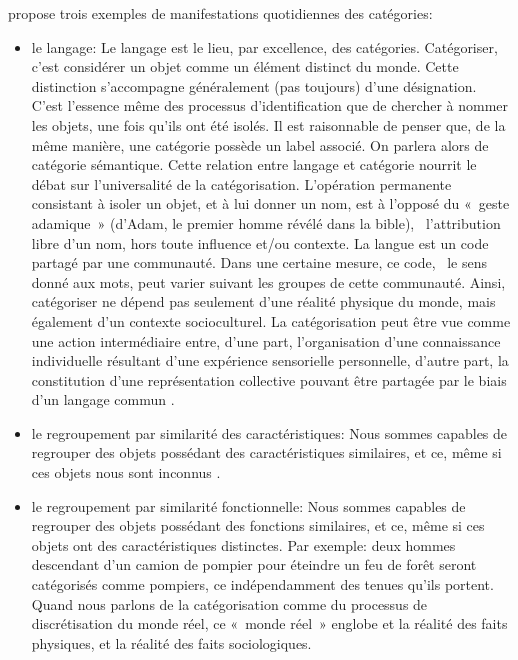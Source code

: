 \citep{anderson1991adaptive} propose trois exemples de manifestations quotidiennes des catégories:

\begin{itemize}

\item le langage: Le langage est le lieu, par excellence, des catégories. Catégoriser, c'est considérer un objet comme un élément distinct du monde. Cette distinction s'accompagne généralement (pas toujours) d'une désignation. C'est l'essence même des processus d'identification que de chercher à nommer les objets, une fois qu'ils ont été isolés. Il est raisonnable de penser que, de la même manière, une catégorie possède un label associé. On parlera alors de catégorie sémantique. Cette relation entre langage et catégorie nourrit le débat sur l'universalité de la catégorisation. L'opération permanente consistant à isoler un objet, et à lui donner un nom, est à l'opposé du «~geste adamique~» (d'Adam, le premier homme révélé dans la bible), \ie~l'attribution libre d'un nom, hors toute influence et/ou contexte. La langue est un code partagé par une communauté. Dans une certaine mesure, ce code, \ie~le sens donné aux mots, peut varier suivant les groupes de cette communauté. Ainsi, catégoriser ne dépend pas seulement d'une réalité physique du monde, mais également d'un contexte socioculturel. La catégorisation peut être vue comme une action intermédiaire entre, d'une part, l'organisation d'une connaissance individuelle résultant d'une expérience sensorielle personnelle, d'autre part, la constitution d'une représentation collective pouvant être partagée par le biais d'un langage commun \citep{dubois2006cognitive}.
\item le regroupement par similarité des caractéristiques: Nous sommes capables de regrouper des objets possédant des caractéristiques similaires, et ce, même si ces objets nous sont inconnus \citep{fried1984induction}.
\item le regroupement par similarité fonctionnelle: Nous sommes capables de regrouper des objets possédant des fonctions similaires, et ce, même si ces objets ont des caractéristiques distinctes. Par exemple: deux hommes descendant d'un camion de pompier pour éteindre un feu de forêt seront catégorisés comme pompiers, ce indépendamment des tenues qu'ils portent. Quand nous parlons de la catégorisation comme du processus de discrétisation du monde réel, ce «~monde réel~» englobe et la réalité des faits physiques, et la réalité des faits sociologiques.
\end{itemize}

